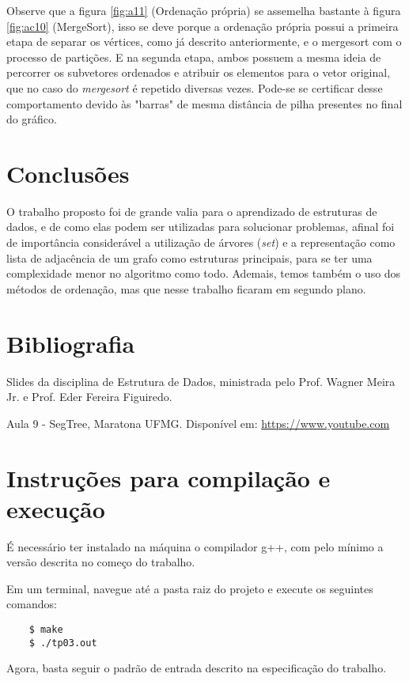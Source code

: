 \documentclass{article}
\begin{document}

Observe que a figura \ref{fig:a11} (Ordenação própria) se assemelha bastante à figura \ref{fig:ac10} (MergeSort), isso se deve porque a ordenação própria possui a primeira etapa de separar os vértices, como já descrito anteriormente, e o mergesort com o processo de partições. 
E na segunda etapa, ambos possuem a mesma ideia de percorrer os subvetores ordenados e atribuir os elementos para o vetor original, que no caso do \emph{mergesort} é repetido diversas vezes. Pode-se se certificar desse comportamento devido às "barras" de mesma distância de pilha presentes no final do gráfico. 


\section{Conclusões}

O trabalho proposto foi de grande valia para o aprendizado de estruturas de dados, e de como elas podem ser utilizadas para solucionar problemas, afinal foi de importância considerável a utilização de árvores (\emph{set}) e a representação como lista de adjacência de um grafo como estruturas principais, para se ter uma complexidade menor no algoritmo como todo. Ademais, temos também o uso dos métodos de ordenação, mas que nesse trabalho ficaram em segundo plano.


\section*{Bibliografia}

Slides da disciplina de Estrutura de Dados, ministrada pelo Prof. Wagner Meira Jr. e Prof. Eder Fereira Figuiredo.

Aula 9 - SegTree, Maratona UFMG. Disponível em: \url{https://www.youtube.com}

\section*{Instruções para compilação e execução}

É necessário ter instalado na máquina o compilador g++, com pelo mínimo a versão descrita no começo do trabalho.  

Em um terminal, navegue até a pasta raiz do projeto e execute os seguintes comandos:

\begin{verbatim}
    $ make
    $ ./tp03.out

\end{verbatim}

Agora, basta seguir o padrão de entrada descrito na especificação do trabalho.
\end{document}
